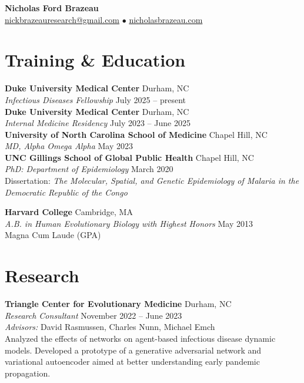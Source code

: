 \documentclass[11pt,letterpaper]{article}
\newcommand{\entry}[4]{%
  \textbf{#1} \hfill #2 \\
  \textit{#3} \hfill #4 \\[2pt]
}
\begin{document}
\begin{center}
{\LARGE\bfseries Nicholas Ford Brazeau}\\[8pt]
\vspace{1pt}
\href{mailto:nickbrazeauresearch@gmail.com}{nickbrazeauresearch@gmail.com} \quad $\bullet$ \quad \href{https://nicholasbrazeau.com}{nicholasbrazeau.com}
\end{center}

\vspace{2pt}

\section{Training \& Education}

\entry{Duke University Medical Center}{Durham, NC}{Infectious Diseases Fellowship}{July 2025 -- present}

\entry{Duke University Medical Center}{Durham, NC}{Internal Medicine Residency}{July 2023 -- June 2025}

\entry{University of North Carolina School of Medicine}{Chapel Hill, NC}{MD, Alpha Omega Alpha}{May 2023}

\entry{UNC Gillings School of Global Public Health}{Chapel Hill, NC}{PhD: Department of Epidemiology}{March 2020}
Dissertation: \textit{The Molecular, Spatial, and Genetic Epidemiology of Malaria in the Democratic Republic of the Congo}

\vspace{14pt}

\entry{Harvard College}{Cambridge, MA}{A.B. in Human Evolutionary Biology with Highest Honors}{May 2013}
Magna Cum Laude (GPA)

\vspace{18pt}

\section{Research}

\entry{Triangle Center for Evolutionary Medicine}{Durham, NC}{Research Consultant}{November 2022 -- June 2023}
\textit{Advisors:} David Rasmussen, Charles Nunn, Michael Emch \\[2pt]
Analyzed the effects of networks on agent-based infectious disease dynamic models. Developed a prototype of a generative adversarial network and variational autoencoder aimed at better understanding early pandemic propagation.

\vspace{12pt}
\end{document}
